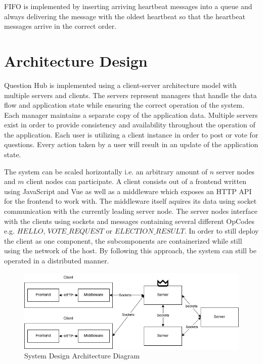 \documentclass[runningheads]{llncs}
\begin{document}
FIFO is implemented by inserting arriving heartbeat messages into a queue and
always delivering the message with the oldest heartbeat so that the heartbeat
messages arrive in the correct order.

\section{Architecture Design}

Question Hub is implemented using a client-server \cite{berson1996client} architecture
model with multiple servers and clients. The servers represent managers that handle the
data flow and application state while ensuring the correct operation of the system.
Each manager maintains a separate copy of the application data. Multiple servers exist
in order to provide consistency and availability throughout the operation of the
application. Each user is utilizing a client instance in order to post or vote for
questions. Every action taken by a user will result in an update of the application state.

The system can be scaled horizontally i.e. an arbitrary amount of $n$ server
nodes and $m$ client nodes can participate. A client consists out of a
frontend written using JavaScript and Vue as well as a middleware which exposes
an HTTP API for the frontend to work with. The middleware itself aquires its
data using socket communication with the currently leading server node. The
server nodes interface with the clients using sockets and messages containing
several different OpCodes e.g. $HELLO$, $VOTE\_REQUEST$ or $ELECTION\_RESULT$.
In order to still deploy the client as one component, the subcomponents are
containerized while still using the network of the host. By following this
approach, the system can still be operated in a distributed manner. 

\begin{figure}
    \centering
    \includegraphics[width=\linewidth]{question_hub_architecture_final.drawio.png}
    \caption{System Design Architecture Diagram}
    \label{fig:enter-label}
\end{figure}
\end{document}
